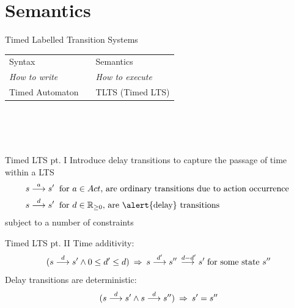 \documentclass{beamer}
\def\dgold#1{{\alert{#1}}}
\def\dkb#1{{\blue #1}}
\def\gry#1{{\gray #1}}
\begin{document}
\section{Semantics}
\begin{slide}{Timed Labelled Transition Systems}
\small\centering
\begin{tabular}{lc@{~~}l}
\toprule 
\dgold{Syntax} && \dgold{Semantics}\\
\cmidrule(lr){1-3}
\gry{\emph{How to write}} & & \gry{\emph{How to execute}}\\
Timed Automaton &  & TLTS (Timed LTS) \\
\bottomrule
\end{tabular}
~\\
~\\
~\\
\pause

\begin{block}{Timed LTS pt. I}
Introduce \alert{delay transitions} to capture the passage of time within a LTS
\begin{align*}
s \tran{a} s' & \;\; \text{for $a \in Act$, are ordinary transitions due to action occurrence }\\
s \tran{d} s' &\; \;  \text{for $d \in \mathbb{R}_{\geq 0}$, are \alert{delay} transitions}
\end{align*}
subject to a number of constraints 
\end{block}
\end{slide}
\begin{slide}{Timed LTS pt. II}
Time additivity:
\begin{equation*}
(s \stackrel{d}{\longrightarrow} s'  \mathbin{\wedge} 0 \leq d' \leq d)\; \mathbin{\Rightarrow}\; s  \stackrel{d'}{\longrightarrow} s'' \stackrel{\; d-d'}{\longrightarrow} s' \; \text{for some state $s''$}
\end{equation*}
Delay transitions are deterministic:
\begin{equation*}
(s \stackrel{d}{\longrightarrow} s'  \mathbin{\wedge} s \stackrel{d}{\longrightarrow} s'')\; \mathbin{\Rightarrow}\; s'  = s''
\end{equation*}
\end{slide}
\end{document}
